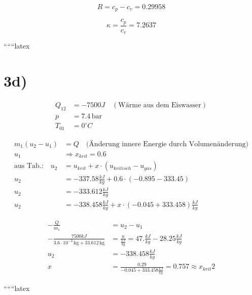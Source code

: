 \[
R = c_p - c_v = 0.29958
\]

\[
\kappa = \frac{c_p}{c_v} = 7.2637
\]

``````latex


\section*{3d)}

\begin{align*}
Q_{12} &= -7500J \quad (\text{Wärme aus dem Eiswasser}) \\
p &= 7.4 \, \text{bar} \\
T_{01} &= 0^\circ C
\end{align*}

\begin{align*}
m_1 (u_2 - u_1) &= Q \quad \text{(Änderung innere Energie durch Volumenänderung)} \\
u_1 &\Rightarrow x_{krit} = 0.6 \\
\text{aus Tab.:} \quad u_2 &= u_{krit} + x \cdot (u_{kritisch} - u_{gas}) \\
u_2 &= -337.58 \frac{kJ}{kg} + 0.6 \cdot (-0.895 - 333.45) \\
u_2 &= -333.612 \frac{kJ}{kg} \\
u_2 &= -338.458 \frac{kJ}{kg} + x \cdot (-0.045 + 333.458) \frac{kJ}{kg}
\end{align*}

\begin{align*}
-\frac{Q}{m_1} &= u_2 - u_1 \\
-\frac{7500 kJ}{3.6 \cdot 10^{-2} \, \text{kg} + 33.612 \, \text{kg}} &= \frac{u}{\frac{kJ}{kg}} = 47. \frac{kJ}{kg} - 28.25 \frac{kJ}{kg} \\
u_2 &= -338.458 \frac{kJ}{kg} \\
x &= \frac{0.29}{-0.045 + 333.458 \frac{kJ}{kg}} = 0.757 \approx x_{krit} 2
\end{align*}

``````latex


